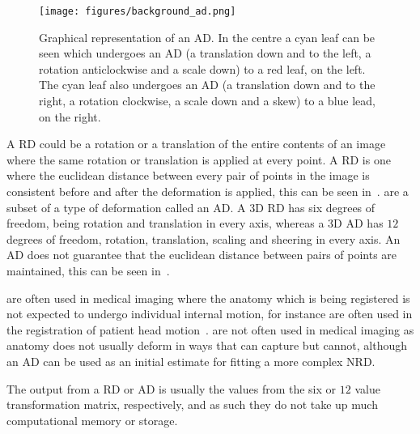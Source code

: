                 \begin{figure}
                    \centering
                    
                    \texttt{[image: figures/background\_ad.png]}
                    
                    \captionsetup{singlelinecheck=false, justification=raggedright}
                    \caption{Graphical representation of an \gls{AD}. In the centre a cyan leaf can be seen which undergoes an \gls{AD} (a translation down and to the left, a rotation anticlockwise and a scale down) to a red leaf, on the left. The cyan leaf also undergoes an \gls{AD} (a translation down and to the right, a rotation clockwise, a scale down and a skew) to a blue lead, on the right.} \label{fig:rigid_transformations_ad}
                \end{figure}
                
                A \gls{RD} could be a rotation or a translation of the entire contents of an image where the same rotation or translation is applied at every point. A \gls{RD} is one where the euclidean distance between every pair of points in the image is consistent before and after the deformation is applied, this can be seen in~.  are a subset of a type of deformation called an \gls{AD}. A \gls{3D} \gls{RD} has six degrees of freedom, being rotation and translation in every axis, whereas a \gls{3D} \gls{AD} has $12$ degrees of freedom, rotation, translation, scaling and sheering in every axis. An \gls{AD} does not guarantee that the euclidean distance between pairs of points are maintained, this can be seen in~.
                
                 are often used in medical imaging where the anatomy which is being registered is not expected to undergo individual internal motion, for instance  are often used in the registration of patient head motion~.  are not often used in medical imaging as anatomy does not usually deform in ways that  can capture but  cannot, although an \gls{AD} can be used as an initial estimate for fitting a more complex \gls{NRD}.
                
                The output from a \gls{RD} or \gls{AD} is usually the values from the six or $12$ value transformation matrix, respectively, and as such they do not take up much computational memory or storage.
                
